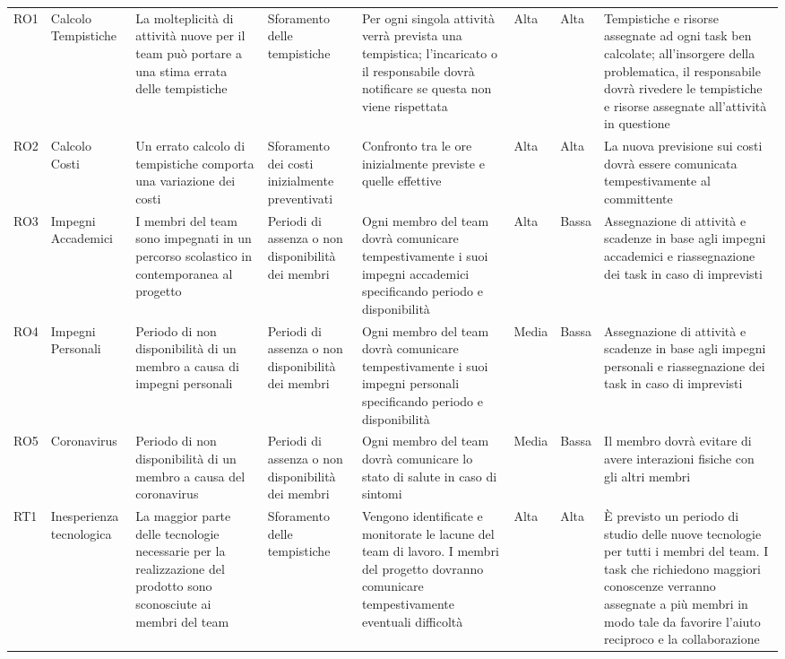\begin{landscape}
\begin{longtable}{p{0.6cm}|p{2.2cm}|p{3.2cm}|p{2cm}|p{4cm}|p{0.9cm}|p{0.8cm}|p{4cm}}
		RO1  & Calcolo Tempistiche & La molteplicità di attività nuove per il team può portare a una stima errata delle tempistiche & Sforamento delle tempistiche & Per ogni singola attività verrà prevista una tempistica; l'incaricato o il responsabile dovrà notificare se questa non viene rispettata & Alta  & Alta  & Tempistiche e risorse assegnate ad ogni task ben calcolate; all’insorgere della problematica, il responsabile dovrà rivedere le tempistiche e risorse assegnate all’attività in questione \\
		RO2 & Calcolo Costi& Un errato calcolo di tempistiche comporta una variazione dei costi & Sforamento dei costi inizialmente preventivati & Confronto tra le ore inizialmente previste e quelle effettive & Alta  & Alta  &  La nuova previsione sui costi dovrà essere comunicata tempestivamente al committente \\
		RO3 & Impegni Accademici & I membri del team sono impegnati in un percorso scolastico in contemporanea al progetto & Periodi di assenza o non disponibilità dei membri & Ogni membro del team dovrà comunicare tempestivamente i suoi impegni accademici specificando periodo e disponibilità & Alta  & Bassa & Assegnazione di attività e scadenze in base agli impegni accademici e riassegnazione dei task in caso di imprevisti \\
		RO4 & Impegni Personali  & Periodo di non disponibilità di un membro a causa di impegni personali & Periodi di assenza o non disponibilità dei membri & Ogni membro del team dovrà comunicare tempestivamente i suoi impegni personali specificando periodo e disponibilità  & Media & Bassa & Assegnazione di attività e scadenze in base agli impegni personali e riassegnazione dei task in caso di imprevisti \\
		RO5 & Coronavirus  & Periodo di non disponibilità di un membro a causa del coronavirus & Periodi di assenza o non disponibilità dei membri & Ogni membro del team dovrà comunicare lo stato di salute in caso di sintomi & Media & Bassa & Il membro dovrà evitare di avere interazioni fisiche con gli altri membri \\
		RT1 & Inesperienza tecnologica & La maggior parte delle tecnologie necessarie per la realizzazione del prodotto sono sconosciute ai membri del team & Sforamento delle tempistiche & Vengono identificate e monitorate le lacune del team di lavoro. I membri del progetto dovranno comunicare tempestivamente eventuali difficoltà & Alta & Alta & È previsto un periodo di studio delle nuove tecnologie per tutti i membri del team. I task che richiedono maggiori conoscenze verranno assegnate a più membri in modo tale da favorire l’aiuto reciproco e la collaborazione \\

\end{longtable}
\end{landscape}
